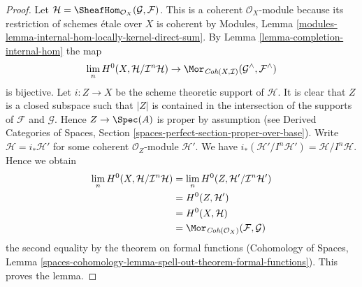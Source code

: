 \begin{proof}
Let $\mathcal{H} = \SheafHom_{\mathcal{O}_X}(\mathcal{G}, \mathcal{F})$.
This is a coherent $\mathcal{O}_X$-module because its restriction
of schemes \'etale over $X$ is coherent by
Modules, Lemma \ref{modules-lemma-internal-hom-locally-kernel-direct-sum}.
By Lemma \ref{lemma-completion-internal-hom} the map
$$
\lim_n H^0(X, \mathcal{H}/\mathcal{I}^n\mathcal{H})
\to
\Mor_{\textit{Coh}(X, \mathcal{I})}
(\mathcal{G}^\wedge, \mathcal{F}^\wedge)
$$
is bijective. Let $i : Z \to X$ be the scheme theoretic support of
$\mathcal{H}$. It is clear that $Z$ is a closed subspace such
that $|Z|$ is contained in the intersection of the supports of $\mathcal{F}$
and $\mathcal{G}$. Hence $Z \to \Spec(A)$ is proper by assumption
(see Derived Categories of Spaces, Section
\ref{spaces-perfect-section-proper-over-base}).
Write $\mathcal{H} = i_*\mathcal{H}'$ for some coherent
$\mathcal{O}_Z$-module $\mathcal{H}'$. We have
$i_*(\mathcal{H}'/I^n\mathcal{H}') = \mathcal{H}/I^n\mathcal{H}$.
Hence we obtain
\begin{align*}
\lim_n H^0(X, \mathcal{H}/\mathcal{I}^n\mathcal{H})
& =
\lim_n H^0(Z, \mathcal{H}'/\mathcal{I}^n\mathcal{H}') \\
& =
H^0(Z, \mathcal{H}') \\
& =
H^0(X, \mathcal{H}) \\
& = 
\Mor_{\textit{Coh}(\mathcal{O}_X)}(\mathcal{F}, \mathcal{G})
\end{align*}
the second equality by the theorem on formal functions
(Cohomology of Spaces, Lemma
\ref{spaces-cohomology-lemma-spell-out-theorem-formal-functions}).
This proves the lemma.
\end{proof}

